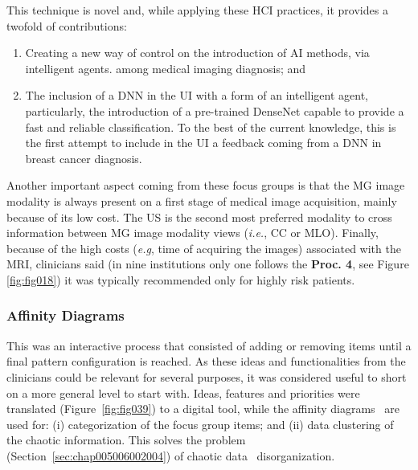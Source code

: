 \hfill

\noindent
This technique is novel and, while applying these \ac{HCI} practices, it provides a twofold of contributions:

\begin{enumerate}
\item Creating a new way of control on the introduction of \ac{AI} methods, via intelligent agents. among medical imaging diagnosis; and
\item The inclusion of a \ac{DNN} in the \ac{UI} with a form of an intelligent agent, particularly, the introduction of a pre-trained DenseNet capable to provide a fast and reliable classification. To the best of the current knowledge, this is the first attempt to include in the \ac{UI} a feedback coming from a \ac{DNN} in breast cancer diagnosis.
\end{enumerate}

Another important aspect coming from these focus groups is that the \ac{MG} image modality is always present on a first stage of medical image acquisition, mainly because of its low cost.
The \ac{US} is the second most preferred modality to cross information between \ac{MG} image modality views ({\it i.e.}, \ac{CC} or \ac{MLO}).
Finally, because of the high costs ({\it e.g}, time of acquiring the images) associated with the \ac{MRI}, clinicians said (in nine institutions only one follows the {\bf Proc. 4}, see Figure \ref{fig:fig018}) it was typically recommended only for highly risk patients.

\subsubsection{Affinity Diagrams}
\label{sec:chap005006002003}

This was an interactive process that consisted of adding or removing items until a final pattern configuration is reached.
As these ideas and functionalities from the clinicians could be relevant for several purposes, it was considered useful to short on a more general level to start with.
Ideas, features and priorities were translated (Figure~\ref{fig:fig039}) to a digital tool\footnotemark[31], while the affinity diagrams~\cite{10.1145/3290605.3300628} are used for: (i) categorization of the focus group items; and (ii) data clustering of the chaotic information.
This solves the problem (Section~\ref{sec:chap005006002004}) of chaotic data~\cite{10.1145/2858036.2858373, 10.1145/3343413.3377983} disorganization.

